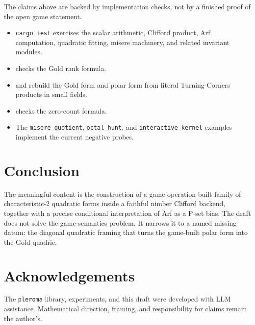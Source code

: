 \documentclass[11pt]{article}
\theoremstyle{definition}
\begin{document}
The claims above are backed by implementation checks, not by a finished proof
of the open game statement.

\begin{itemize}[leftmargin=*]
\item \texttt{cargo test} exercises the scalar arithmetic, Clifford product,
Arf computation, quadratic fitting, misere machinery, and related invariant
modules.
\item {} checks the Gold rank formula.
\item {} and
 rebuild the Gold form and polar form
from literal Turning-Corners products in small fields.
\item {} checks the zero-count formula.
\item The \texttt{misere\_quotient}, \texttt{octal\_hunt}, and
\texttt{interactive\_kernel} examples implement the current negative probes.
\end{itemize}

\section{Conclusion}

The meaningful content is the construction of a game-operation-built family of
characteristic-$2$ quadratic forms inside a faithful nimber Clifford backend,
together with a precise conditional interpretation of Arf as a P-set bias. The
draft does not solve the game-semantics problem. It narrows it to a named
missing datum: the diagonal quadratic framing that turns the game-built polar
form into the Gold quadric.

\section*{Acknowledgements}
The \texttt{pleroma} library, experiments, and this draft were developed with
LLM assistance. Mathematical direction, framing, and responsibility for claims
remain the author's.
\end{document}
